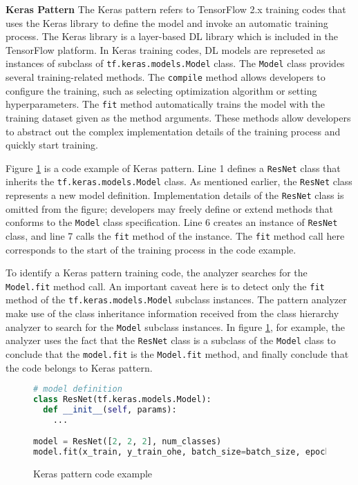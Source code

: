 \textbf{Keras Pattern}
The Keras pattern refers to TensorFlow 2.x training codes that uses
the Keras library to define the model and invoke an automatic
training process.
The Keras library\cite{keras} is a layer-based DL library which is
included in the TensorFlow platform.
In Keras training codes, DL models are represeted as instances of
subclass of {\tt tf.keras.models.Model} class.
The {\tt Model} class provides several training-related methods.
The {\tt compile} method allows developers to configure the training,
such as selecting optimization algorithm or setting hyperparameters.
The {\tt fit} method automatically trains the model with
the training dataset given as the method arguments.
These methods allow developers to abstract out the complex implementation
details of the training process and quickly start training.

Figure \ref{fig:keraspattern} is a code example of Keras pattern.
Line 1 defines a {\tt ResNet} class that inherits the 
{\tt tf.keras.models.Model} class. As mentioned earlier, the {\tt ResNet}
class represents a new model definition.
Implementation details of the {\tt ResNet} class is omitted from the 
figure; developers may freely define or extend methods that conforms to the
{\tt Model} class specification.
Line 6 creates an instance of {\tt ResNet} class, and line 7
calls the {\tt fit} method of the instance. 
The {\tt fit} method call here corresponds to the start of the training process
in the code example.

To identify a Keras pattern training code, the analyzer searches for the
{\tt Model.fit} method call. An important caveat here is to 
detect only the {\tt fit} method of the {\tt tf.keras.models.Model} 
subclass instances. The pattern analyzer make use of the class inheritance
information received from the class hierarchy analyzer to search for
the {\tt Model} subclass instances. In figure \ref{fig:keraspattern},
for example, the analyzer uses the fact that the {\tt ResNet} class is
a subclass of the {\tt Model} class to conclude that the {\tt model.fit}
is the {\tt Model.fit} method, and finally conclude that the code
belongs to Keras pattern.


\begin{figure}[!ht]
  \begin{lstlisting}[language=Python]
# model definition
class ResNet(tf.keras.models.Model):
  def __init__(self, params):
    ...

model = ResNet([2, 2, 2], num_classes)
model.fit(x_train, y_train_ohe, batch_size=batch_size, epochs=epochs,
  \end{lstlisting}
  \label{fig:keraspattern}
  \caption{Keras pattern code example}
\end{figure}
